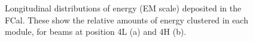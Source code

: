 %
%
%


%
%
\begin{figure}[t]
\begin{center}
\caption[Hadronic shower profiles, longitudinal]{Longitudinal distributions of energy (EM scale) deposited in the FCal. These show the relative amounts of energy clustered in each module, for beams at position 4L (a) and 4H (b).}
\label{TBplot_long_profiles}
\end{center}
\end{figure}


%
%
%


